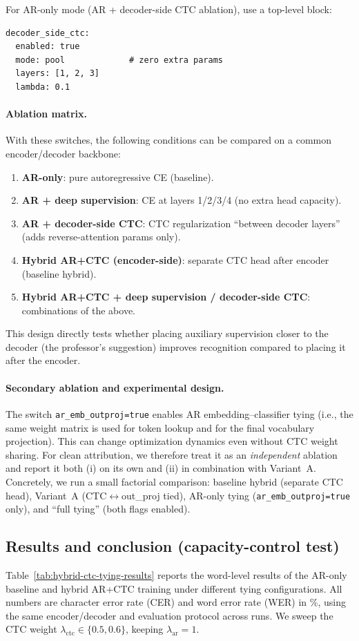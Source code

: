 For AR-only mode (AR + decoder-side CTC ablation), use a top-level block:
\begin{verbatim}
decoder_side_ctc:
  enabled: true
  mode: pool             # zero extra params
  layers: [1, 2, 3]
  lambda: 0.1
\end{verbatim}

\paragraph{Ablation matrix.}
With these switches, the following conditions can be compared on a common encoder/decoder backbone:
\begin{enumerate}
  \item \textbf{AR-only}: pure autoregressive CE (baseline).
  \item \textbf{AR + deep supervision}: CE at layers 1/2/3/4 (no extra head capacity).
  \item \textbf{AR + decoder-side CTC}: CTC regularization ``between decoder layers'' (adds reverse-attention params only).
  \item \textbf{Hybrid AR+CTC (encoder-side)}: separate CTC head after encoder (baseline hybrid).
  \item \textbf{Hybrid AR+CTC + deep supervision / decoder-side CTC}: combinations of the above.
\end{enumerate}
This design directly tests whether placing auxiliary supervision closer to the decoder (the professor's suggestion) improves recognition compared to placing it after the encoder.

\paragraph{Secondary ablation and experimental design.}
The switch \texttt{ar\_emb\_outproj=true} enables AR embedding--classifier tying (i.e., the same weight matrix is used for token lookup and for the final vocabulary projection).
This can change optimization dynamics even without CTC weight sharing.
For clean attribution, we therefore treat it as an \emph{independent} ablation and report it both (i) on its own and (ii) in combination with Variant~A.
Concretely, we run a small factorial comparison: baseline hybrid (separate CTC head), Variant~A (CTC$\leftrightarrow$out\_proj tied), AR-only tying (\texttt{ar\_emb\_outproj=true} only), and ``full tying'' (both flags enabled).

\subsection{Results and conclusion (capacity-control test)}
\label{sec:ctc-weight-tying-results}
Table~\ref{tab:hybrid-ctc-tying-results} reports the word-level results of the AR-only baseline and hybrid AR+CTC training under different tying configurations.
All numbers are character error rate (CER) and word error rate (WER) in \%, using the same encoder/decoder and evaluation protocol across runs.
We sweep the CTC weight $\lambda_{\text{ctc}}\in\{0.5,0.6\}$, keeping $\lambda_{\text{ar}}=1$.

